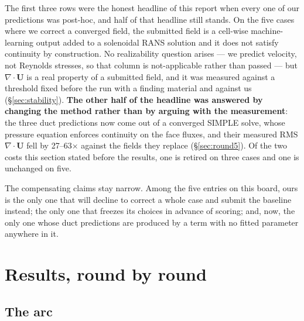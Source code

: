 \documentclass[11pt,a4paper]{article}
\begin{document}
The first three rows were the honest headline of this report when every one of our
predictions was post-hoc, and half of that headline still stands. On the five cases where
we correct a converged field, the submitted field is a cell-wise machine-learning output
added to a solenoidal RANS solution and it does not satisfy continuity by construction. No
realizability question arises --- we predict velocity, not Reynolds stresses, so that
column is not-applicable rather than passed --- but $\nabla\cdot\mathbf{U}$ is a real
property of a submitted field, and it was measured against a threshold fixed before the run
with a finding material and against us (\S\ref{sec:stability}). \textbf{The other half of
the headline was answered by changing the method rather than by arguing with the
measurement}: the three duct predictions now come out of a converged SIMPLE solve, whose
pressure equation enforces continuity on the face fluxes, and their measured RMS
$\nabla\cdot\mathbf{U}$ fell by 27--63$\times$ against the fields they replace
(\S\ref{sec:round5}). Of the two costs this section stated before the results, one is
retired on three cases and one is unchanged on five.

The compensating claims stay narrow. Among the five entries on this board, ours is the only
one that will decline to correct a whole case and submit the baseline instead; the only one
that freezes its choices in advance of scoring; and, now, the only one whose duct
predictions are produced by a term with no fitted parameter anywhere in it.

\section{Results, round by round}

\subsection{The arc}
\end{document}

